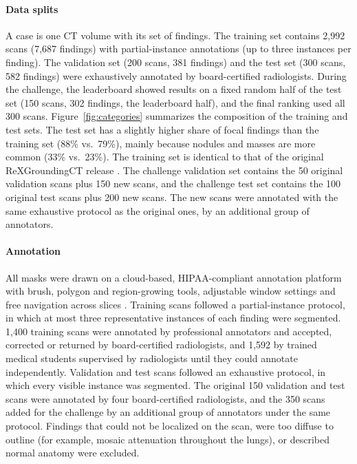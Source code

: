 \documentclass[final,5p,times,twocolumn,authoryear,numafflabel]{elsarticle}
\begin{document}
\paragraph{Data splits}
A case is one CT volume with its set of findings.
The training set contains 2,992 scans (7,687 findings) with partial-instance
annotations (up to three instances per finding). The validation set
(200 scans, 381 findings) and the test set (300 scans, 582 findings) were
exhaustively annotated by board-certified radiologists. During the challenge,
the leaderboard showed results on a fixed random half of the test set
(150 scans, 302 findings, the leaderboard half), and the final ranking used all
300 scans.
Figure~\ref{fig:categories} summarizes the composition of the training and
test sets. The test set has a slightly higher share of focal findings than the
training set (88\% vs.\ 79\%), mainly because nodules and masses are more common (33\%
vs.\ 23\%).
The training set is identical to that of the original ReXGroundingCT release
\citep{baharoon2026rexgroundingct}. The challenge
validation set contains the 50 original validation scans plus 150
new scans, and the challenge test set contains
the 100 original test scans plus 200 new scans. The new scans were annotated
with the same exhaustive protocol as the original ones, by an additional group of
annotators.

\paragraph{Annotation}
All masks were drawn on a cloud-based, HIPAA-compliant annotation platform
with brush, polygon and region-growing tools, adjustable window settings and
free navigation across slices \citep{baharoon2026rexgroundingct}. Training scans followed a
partial-instance protocol, in which at most three representative instances of
each finding were segmented. 1,400 training scans were annotated by
professional annotators and accepted, corrected or returned by board-certified
radiologists, and 1,592 by trained medical students supervised by
radiologists until they could annotate independently. Validation and test scans
followed an exhaustive protocol, in which every visible instance was segmented.
The original 150 validation and test scans were annotated by four
board-certified radiologists, and the 350 scans added for the challenge by
an additional group of annotators under the same protocol. Findings that could
not be localized on the scan, were too diffuse to outline
(for example, mosaic attenuation throughout the lungs), or described
normal anatomy were excluded.
\end{document}
